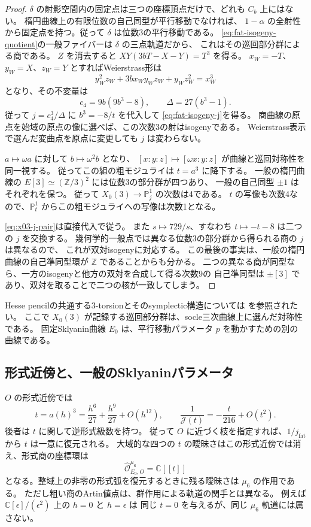 \documentclass[a4paper,11pt]{ltjsarticle}
\theoremstyle{definition}
\newcommand{\CC}{\mathbb C}
\newcommand{\OO}{\mathcal O}
\newcommand{\PP}{\mathbb P}
\begin{document}
\begin{proof}
$\delta$ の射影空間内の固定点は三つの座標頂点だけで、どれも $C_b$ 上にはない。
楕円曲線上の有限位数の自己同型が平行移動でなければ、
$1-\alpha$ の全射性から固定点を持つ。従って $\delta$ は位数3の平行移動である。
\eqref{eq:fat-isogeny-quotient}の一般ファイバーは $\delta$ の三点軌道だから、
これはその巡回部分群による商である。
$Z$ を消去すると $XY(3bT-X-Y)=T^3$ を得る。
$x_W=-T$、$y_W=X$、$z_W=Y$ とすればWeierstrass形は
\[
 y_W^2z_W+3b x_Wy_Wz_W+y_Wz_W^2=x_W^3
\]
となり、その不変量は
\[
 c_4=9b(9b^3-8),\qquad\Delta=27(b^3-1).
\]
従って $j=c_4^3/\Delta$ に $b^3=-8/t$ を代入して
\eqref{eq:fat-isogeny-j}を得る。
商曲線の原点を始域の原点の像に選べば、この次数3の射はisogenyである。
Weierstrass表示で選んだ変曲点を原点に変更しても $j$ は変わらない。

$a\mapsto\omega a$ に対して $b\mapsto\omega^2b$ となり、
$[x:y:z]\mapsto[\omega x:y:z]$ が曲線と巡回対称性を同一視する。
従ってこの組の粗モジュライは $t=a^3$ に降下する。
一般の楕円曲線の $E[3]\simeq(\mathbb Z/3)^2$ には位数3の部分群が四つあり、
一般の自己同型 $\pm1$ はそれぞれを保つ。
従って $X_0(3)\to\PP^1_j$ の次数は4である。
$t$ の写像も次数4なので、$\PP^1_t$ からこの粗モジュライへの写像は次数1となる。

\eqref{eq:x03-j-pair}は直接代入で従う。
また $s\mapsto729/s$、すなわち $t\mapsto-t-8$ は二つの $j$ を交換する。
幾何学的一般点では異なる位数3の部分群から得られる商の $j$ は異なるので、
これが双対isogenyに対応する。
この最後の事実は、一般の楕円曲線の自己準同型環が $\mathbb Z$ であることからも分かる。
二つの異なる商が同型なら、一方のisogenyと他方の双対を合成して得る次数9の
自己準同型は $\pm[3]$ であり、双対を取ることで二つの核が一致してしまう。
\end{proof}

Hesse pencilの共通する3-torsionとそのsymplectic構造については
\cite[Theorem 1.1 and Sections 2--4]{ATT}を参照されたい。
ここで $X_0(3)$ が記録する巡回部分群は、socle三次曲線上に選んだ対称性である。
固定Sklyanin曲線 $E_0$ は、平行移動パラメータ $p$ を動かすための別の曲線である。

\subsection{形式近傍と、一般のSklyaninパラメータ}

$O$ の形式近傍では
\[
 t=a(h)^3=\frac{h^6}{27}+\frac{h^9}{27}+O(h^{12}),\qquad
 \frac1{\mathcal J(t)}=-\frac{t}{216}+O(t^2).
\]
後者は $t$ に関して逆形式級数を持つ。
従って $O$ に近づく枝を指定すれば、$1/j_{\mathrm{fat}}$ から $t$ は一意に復元される。
大域的な四つの $t$ の曖昧さはこの形式近傍では消え、形式商の座標環は
\[
 \widehat{\OO}_{E_0,O}^{\mu_6}=\CC[[t]]
\]
となる。整域上の非零の形式弧を復元するときに残る曖昧さは $\mu_6$ の作用である。
ただし粗い商のArtin値点は、群作用による軌道の関手とは異なる。
例えば $\CC[\epsilon]/(\epsilon^2)$ 上の $h=0$ と $h=\epsilon$ は
同じ $t=0$ を与えるが、同じ $\mu_6$ 軌道には属さない。
\end{document}
